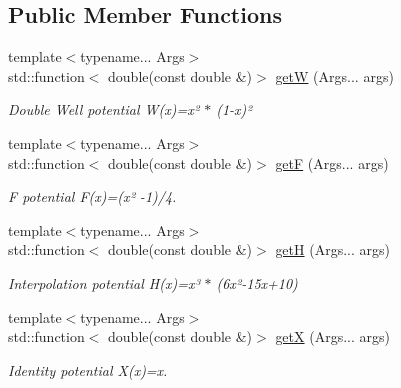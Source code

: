 \subsection*{Public Member Functions}
\begin{DoxyCompactItemize}
\item 
{\footnotesize template$<$typename... Args$>$ }\\std\+::function$<$ double(const double \&)$>$ \hyperlink{structpotential__function_3_010_00_01ThermodynamicsPotentialDiscretization_1_1Implicit_01_4_ac15781824e0ce378683ca91749cd6eb8}{getW} (Args... args)
\begin{DoxyCompactList}\small\item\em Double Well potential W(x)=x² $\ast$ (1-\/x)² \end{DoxyCompactList}\item 
{\footnotesize template$<$typename... Args$>$ }\\std\+::function$<$ double(const double \&)$>$ \hyperlink{structpotential__function_3_010_00_01ThermodynamicsPotentialDiscretization_1_1Implicit_01_4_a18b8e58d6110096f4edb09d4d4df53e7}{getF} (Args... args)
\begin{DoxyCompactList}\small\item\em F potential F(x)=(x² -\/1)/4. \end{DoxyCompactList}\item 
{\footnotesize template$<$typename... Args$>$ }\\std\+::function$<$ double(const double \&)$>$ \hyperlink{structpotential__function_3_010_00_01ThermodynamicsPotentialDiscretization_1_1Implicit_01_4_a74d232601bbe797c14897e297134c938}{getH} (Args... args)
\begin{DoxyCompactList}\small\item\em Interpolation potential H(x)=x³ $\ast$ (6x²-\/15x+10) \end{DoxyCompactList}\item 
{\footnotesize template$<$typename... Args$>$ }\\std\+::function$<$ double(const double \&)$>$ \hyperlink{structpotential__function_3_010_00_01ThermodynamicsPotentialDiscretization_1_1Implicit_01_4_ac1e8415ca039946ab75d5da92b956d7f}{getX} (Args... args)
\begin{DoxyCompactList}\small\item\em Identity potential X(x)=x. \end{DoxyCompactList}\end{DoxyCompactItemize}


